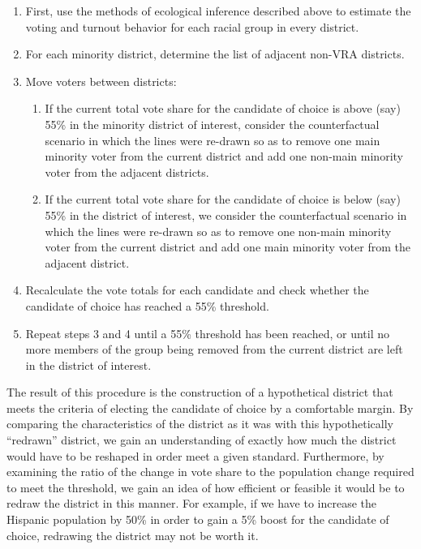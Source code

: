 \documentclass[12pt,draft]{scrartcl}
\begin{document}
\begin{enumerate}
\item First, use the methods of ecological inference described above
  to estimate the voting and turnout behavior for each racial group in
  every district.

\item For each minority district, determine the list of adjacent
  non-VRA districts.

\item Move voters between districts:
  \begin{enumerate}
  \item If the current total vote share for the candidate of choice is
    above (say) 55\% in the minority district of interest, consider
    the counterfactual scenario in which the lines were re-drawn so as
    to remove one main minority voter from the current district and
    add one non-main minority voter from the adjacent districts.
  \item If the current total vote share for the candidate of choice is
    below (say) 55\% in the district of interest, we consider the
    counterfactual scenario in which the lines were re-drawn so as to
    remove one non-main minority voter from the current district and
    add one main minority voter from the adjacent district.
  \end{enumerate}

\item Recalculate the vote totals for each candidate and check whether
  the candidate of choice has reached a 55\% threshold.

\item Repeat steps 3 and 4 until a 55\% threshold has been reached, or
  until no more members of the group being removed from the current
  district are left in the district of interest.
\end{enumerate}

The result of this procedure is the construction of a hypothetical
district that meets the criteria of electing the candidate of choice
by a comfortable margin. By comparing the characteristics of the
district as it was with this hypothetically ``redrawn'' district, we
gain an understanding of exactly how much the district would have to
be reshaped in order meet a given standard. Furthermore, by examining
the ratio of the change in vote share to the population change
required to meet the threshold, we gain an idea of how efficient or
feasible it would be to redraw the district in this manner. For
example, if we have to increase the Hispanic population by 50\% in
order to gain a 5\% boost for the candidate of choice, redrawing the
district may not be worth it.
\end{document}
